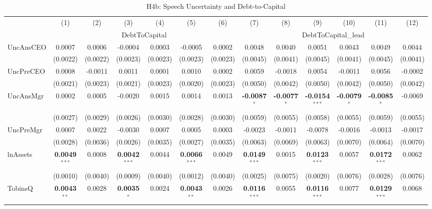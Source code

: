 \begin{landscape}
\begin{table}[H]
\setlength{\tabcolsep}{3pt}
\renewcommand{\arraystretch}{0.85}
\centering
\caption{H4b: Speech Uncertainty and Debt-to-Capital}
\label{tab:h4b}
\scriptsize
\begin{tabular}{lcccccccccccc}
\toprule
 & (1) & (2) & (3) & (4) & (5) & (6) & (7) & (8) & (9) & (10) & (11) & (12) \\
 & \multicolumn{6}{c}{DebtToCapital} & \multicolumn{6}{c}{DebtToCapital\_lead} \\
\cmidrule(lr){2-7} \cmidrule(lr){8-13}
\midrule
UncAnsCEO & 0.0007 & 0.0006 & -0.0004 & 0.0003 & -0.0005 & 0.0002 & 0.0048 & 0.0040 & 0.0051 & 0.0043 & 0.0049 & 0.0044 \\
 & (0.0022) & (0.0022) & (0.0023) & (0.0023) & (0.0023) & (0.0023) & (0.0045) & (0.0041) & (0.0045) & (0.0041) & (0.0045) & (0.0041) \\
UncPreCEO & 0.0008 & -0.0011 & 0.0011 & 0.0001 & 0.0010 & 0.0002 & 0.0059 & -0.0018 & 0.0054 & -0.0011 & 0.0056 & -0.0002 \\
 & (0.0021) & (0.0023) & (0.0021) & (0.0023) & (0.0020) & (0.0023) & (0.0050) & (0.0042) & (0.0050) & (0.0042) & (0.0050) & (0.0042) \\
UncAnsMgr & 0.0002 & 0.0005 & -0.0020 & 0.0015 & 0.0014 & 0.0013 & \textbf{-0.0087}$^{*}$ & \textbf{-0.0077}$^{*}$ & \textbf{-0.0154}$^{***}$ & \textbf{-0.0079}$^{*}$ & \textbf{-0.0085}$^{*}$ & -0.0069 \\
 & (0.0027) & (0.0029) & (0.0026) & (0.0030) & (0.0028) & (0.0030) & (0.0059) & (0.0055) & (0.0058) & (0.0055) & (0.0059) & (0.0055) \\
UncPreMgr & 0.0007 & 0.0022 & -0.0030 & 0.0007 & 0.0005 & 0.0003 & -0.0023 & -0.0011 & -0.0078 & -0.0016 & -0.0013 & -0.0017 \\
 & (0.0028) & (0.0036) & (0.0026) & (0.0035) & (0.0027) & (0.0035) & (0.0063) & (0.0069) & (0.0063) & (0.0070) & (0.0064) & (0.0070) \\
\midrule
lnAssets & \textbf{0.0049}$^{***}$ & 0.0008 & \textbf{0.0042}$^{***}$ & 0.0044 & \textbf{0.0066}$^{***}$ & 0.0049 & \textbf{0.0149}$^{***}$ & 0.0015 & \textbf{0.0123}$^{***}$ & 0.0057 & \textbf{0.0172}$^{***}$ & 0.0062 \\
 & (0.0010) & (0.0040) & (0.0009) & (0.0040) & (0.0012) & (0.0040) & (0.0025) & (0.0075) & (0.0020) & (0.0076) & (0.0028) & (0.0076) \\
TobinsQ & \textbf{0.0043}$^{**}$ & 0.0028 & \textbf{0.0035}$^{*}$ & 0.0024 & \textbf{0.0043}$^{**}$ & 0.0026 & \textbf{0.0116}$^{***}$ & 0.0055 & \textbf{0.0116}$^{***}$ & 0.0077 & \textbf{0.0129}$^{***}$ & 0.0068 \\

\end{tabular}
\end{table}
\end{landscape}

